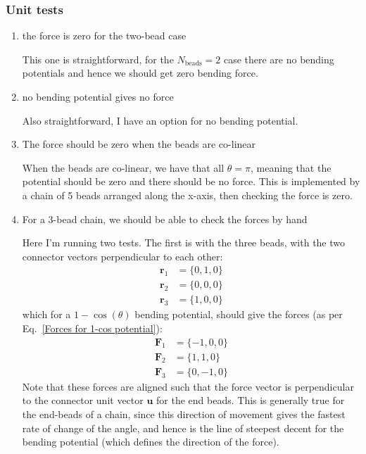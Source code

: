 \documentclass{article}
\begin{document}
\subsubsection{Unit tests}
\begin{enumerate}

    \item the force is zero for the two-bead case
    
\noindent This one is straightforward, for the $N_\mathrm{beads} = 2$ case there are no bending potentials and hence we should get zero bending force.

    \item no bending potential gives no force
    
\noindent Also straightforward, I have an option for no bending potential.

    \item The force should be zero when the beads are co-linear
    
\noindent When the beads are co-linear, we have that all $\theta = \pi$, meaning that the potential should be zero and there should be no force. This is implemented by a chain of 5 beads arranged along the x-axis, then checking the force is zero.

    \item For a 3-bead chain, we should be able to check the forces by hand
    
\noindent Here I'm running two tests. The first is with the three beads, with the two connector vectors perpendicular to each other:
\begin{align*}
    \bm{r}_1 &= \{ 0, 1, 0 \} \\
    \bm{r}_2 &= \{ 0, 0, 0 \} \\
    \bm{r}_3 &= \{ 1, 0, 0 \}
\end{align*}
which for a $1-\cos(\theta)$ bending potential, should give the forces (as per Eq.~\eqref{Forces for 1-cos potential}):
\begin{align*}
    \bm{F}_1 &= \{ -1, 0, 0 \} \\
    \bm{F}_2 &= \{ 1, 1, 0 \} \\
    \bm{F}_3 &= \{ 0, -1, 0 \}
\end{align*}
Note that these forces are aligned such that the force vector is perpendicular to the connector unit vector $\bm{u}$ for the end beads. 
This is generally true for the end-beads of a chain, since this direction of movement gives the fastest rate of change of the angle, and hence is the line of steepest decent for the bending potential (which defines the direction of the force). 


\end{enumerate}
\end{document}
